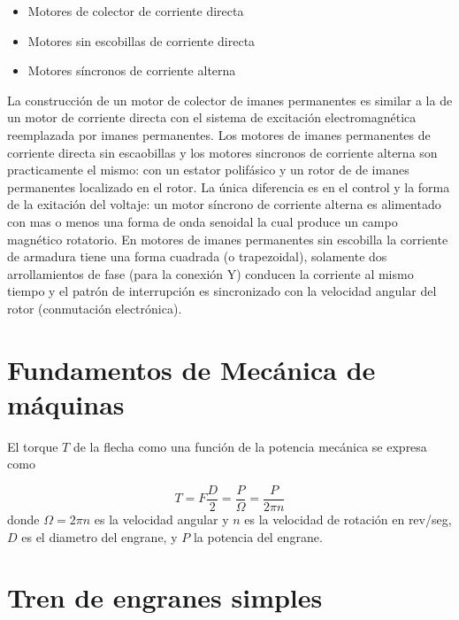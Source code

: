 \documentclass[12pt]{book}
\theoremstyle{definition}
\theoremstyle{remark}
\theoremstyle{plain}
\begin{document}
\begin{itemize}
\item Motores de colector de corriente directa
\item Motores sin escobillas de corriente directa
\item Motores síncronos de corriente alterna
\end{itemize}

La construcción de un motor de colector de imanes permanentes es similar a la de un motor de corriente directa con el sistema de excitación electromagnética reemplazada por imanes permanentes. Los motores de imanes permanentes de corriente directa sin escaobillas y los motores sincronos de corriente alterna son practicamente el mismo: con un estator polifásico y un rotor de de imanes permanentes localizado en el rotor. La única diferencia es en el control y la forma de la exitación del voltaje: un motor síncrono de corriente alterna es alimentado con mas o menos una forma de onda senoidal la cual produce un campo magnético rotatorio. En motores de imanes permanentes sin escobilla la corriente de armadura tiene una forma cuadrada (o trapezoidal), solamente dos arrollamientos de fase (para la conexión Y) conducen la corriente al mismo tiempo y el patrón de interrupción es sincronizado con la velocidad angular del rotor (conmutación electrónica).

\section{Fundamentos de Mecánica de máquinas}

El torque $T$ de la flecha como una función de la potencia mecánica se expresa como

\begin{equation}
\label{equ100}
T = F \frac{D}{2}= \frac{P}{\Omega}=\frac{P}{2 \pi n}
\end{equation}
donde $\Omega = 2 \pi n$ es la velocidad angular y $n$ es la velocidad de rotación en rev/seg, $D$ es el diametro del engrane, y $P$ la potencia del engrane.

\section{Tren de engranes simples}
\end{document}
